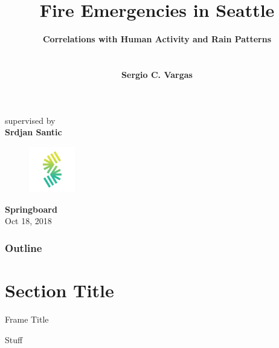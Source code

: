 \documentclass[t,11pt,compress,xcolor=table,hyperref={bookmarks=false}]{beamer}
\title[]{\textbf{\textsf{Fire Emergencies in Seattle}}}
\author[]{
\textsf{\large\textbf{Correlations with Human Activity and Rain Patterns}}
\\
\textsf{}
\\
\textsf{}
\\
\textsf{\large\textbf{Sergio C. Vargas}} 
}
\institute{}
\date{}
\begin{document}
\begin{frame}[plain]
\titlepage
\vspace{-2.2 cm}
\begin{center}
\textsf{\small{supervised by}}
\\
\textsf{\large\textbf{Srdjan Santic}}
\end{center}
\vspace{-0.5 cm}
\begin{figure}
\centering
\includegraphics[height=2cm]{figs/sp_logo}
\end{figure}
\vspace{-1 cm}
\begin{center}
\textsf{\large{\textbf{Springboard}}}
\\
\textsf{\small{Oct 18, 2018}}
\end{center}
\end{frame}


\begin{frame}
\frametitle{Outline}
\tableofcontents
\end{frame}




\section{Section Title}

\begin{frame}{Frame Title}

Stuff


\end{frame}




%
%
\end{document}

